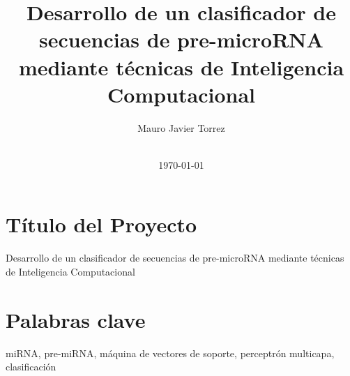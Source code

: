 \documentclass[12pt,bibliography=oldstyle,DIV=12,parskip=full-]{scrartcl}
\begin{document}
%
\begin{titlepage}
%
\titlehead{\center Universidad Nacional del Litoral\\
  Facultad de Ingeniería y Ciencias Hídricas}
%
\subject{Ingeniería en Informática\\
  Propuesta de Proyecto Final de Carrera}
%
\title{Desarrollo de un clasificador de secuencias de pre-microRNA
  mediante técnicas de Inteligencia Computacional}
\author{Mauro Javier Torrez}
%
\publishers{\-\\[4em]{Director\\Dr. Diego H. Milone}%
}
%
\date{\-\\[2em]\today}
%
\renewcommand*{\titlepagestyle}{empty}
\maketitle
\end{titlepage}
\setcounter{page}{1}
%
%
\section{Título del Proyecto}
Desarrollo de un clasificador de
secuencias de pre-microRNA mediante
técnicas de Inteligencia Computacional
%
%
\section{Palabras clave}
miRNA, pre-miRNA, máquina de vectores
de soporte, perceptrón multicapa, clasificación
%
%
\end{document}
